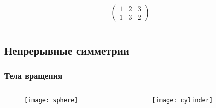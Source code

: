 \begin{frame}
\begin{columns}
\begin{column}{0.33\textwidth}
\begin{figure}[H]
            \end{figure}
            \vspace{-0.2cm}
            \begin{equation*}
                \left(\begin{array}{ccc}
                    1 & 2 & 3 \\
                    1 & 3 & 2 
                \end{array}\right)
            \end{equation*}
            \vspace{-0.5cm}
            \begin{figure}[H]
                \begin{centering}
                    
                \end{centering}
            \end{figure}
        \end{column}
    \end{columns}
\end{frame}

\subsection{Непрерывные симметрии}
\begin{frame}
    \frametitle{Тела вращения}
    \begin{columns}
        \begin{column}{0.6\textwidth}
            \begin{figure}
                \begin{centering}
                    \texttt{[image: sphere]}
                \end{centering}
            \end{figure}
        \end{column}
        \begin{column}{0.4\textwidth}
            \begin{figure}
                \begin{centering}
                    \texttt{[image: cylinder]}
                \end{centering}
            \end{figure}
        \end{column}
    \end{columns}
\end{frame}


